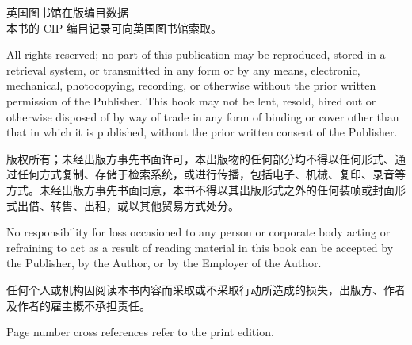 \vspace{0.65em} \begin{chineseblock}英国图书馆在版编目数据\\
本书的 CIP 编目记录可向英国图书馆索取。 \par \end{chineseblock}

\vspace{0.65em} \begin{englishblock} All rights reserved; no part of this publication may be reproduced, stored in a retrieval system, or transmitted in any form or by any means, electronic, mechanical, photocopying, recording, or otherwise without the prior written permission of the Publisher. This book may not be lent, resold, hired out or otherwise disposed of by way of trade in any form of binding or cover other than that in which it is published, without the prior written consent of the Publisher. \par \end{englishblock}

\vspace{0.65em} \begin{chineseblock}版权所有；未经出版方事先书面许可，本出版物的任何部分均不得以任何形式、通过任何方式复制、存储于检索系统，或进行传播，包括电子、机械、复印、录音等方式。未经出版方事先书面同意，本书不得以其出版形式之外的任何装帧或封面形式出借、转售、出租，或以其他贸易方式处分。 \par \end{chineseblock}

\vspace{0.65em} \begin{englishblock} No responsibility for loss occasioned to any person or corporate body acting or refraining to act as a result of reading material in this book can be accepted by the Publisher, by the Author, or by the Employer of the Author. \par \end{englishblock}

\vspace{0.65em} \begin{chineseblock}任何个人或机构因阅读本书内容而采取或不采取行动所造成的损失，出版方、作者及作者的雇主概不承担责任。 \par \end{chineseblock}

\vspace{0.85em} \begin{englishblock} Page number cross references refer to the print edition. \par \end{englishblock}


